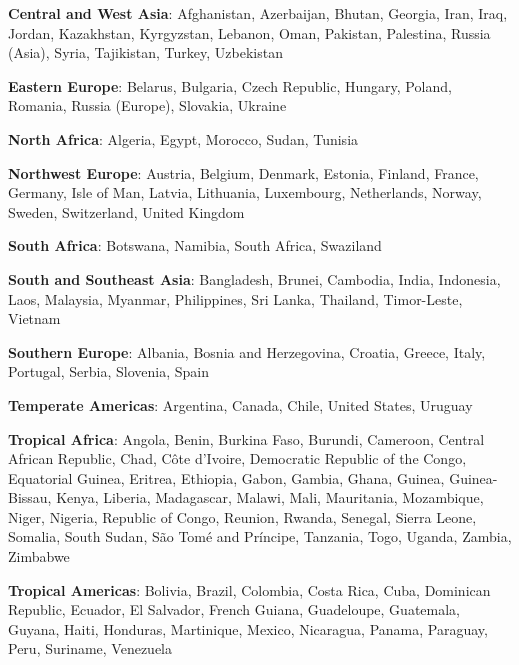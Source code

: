 \item \textbf{Central and West Asia}: Afghanistan, Azerbaijan, Bhutan, Georgia, Iran, Iraq, Jordan, Kazakhstan, Kyrgyzstan, Lebanon, Oman, Pakistan, Palestina, Russia (Asia), Syria, Tajikistan, Turkey, Uzbekistan
\item \textbf{Eastern Europe}: Belarus, Bulgaria, Czech Republic, Hungary, Poland, Romania, Russia (Europe), Slovakia, Ukraine
\item \textbf{North Africa}: Algeria, Egypt, Morocco, Sudan, Tunisia
\item \textbf{Northwest Europe}: Austria, Belgium, Denmark, Estonia, Finland, France, Germany, Isle of Man, Latvia, Lithuania, Luxembourg, Netherlands, Norway, Sweden, Switzerland, United Kingdom
\item \textbf{South Africa}: Botswana, Namibia, South Africa, Swaziland
\item \textbf{South and Southeast Asia}: Bangladesh, Brunei, Cambodia, India, Indonesia, Laos, Malaysia, Myanmar, Philippines, Sri Lanka, Thailand, Timor-Leste, Vietnam
\item \textbf{Southern Europe}: Albania, Bosnia and Herzegovina, Croatia, Greece, Italy, Portugal, Serbia, Slovenia, Spain
\item \textbf{Temperate Americas}: Argentina, Canada, Chile, United States, Uruguay
\item \textbf{Tropical Africa}: Angola, Benin, Burkina Faso, Burundi, Cameroon, Central African Republic, Chad, Côte d'Ivoire, Democratic Republic of the Congo, Equatorial Guinea, Eritrea, Ethiopia, Gabon, Gambia, Ghana, Guinea, Guinea-Bissau, Kenya, Liberia, Madagascar, Malawi, Mali, Mauritania, Mozambique, Niger, Nigeria, Republic of Congo, Reunion, Rwanda, Senegal, Sierra Leone, Somalia, South Sudan, São Tomé and Príncipe, Tanzania, Togo, Uganda, Zambia, Zimbabwe
\item \textbf{Tropical Americas}: Bolivia, Brazil, Colombia, Costa Rica, Cuba, Dominican Republic, Ecuador, El Salvador, French Guiana, Guadeloupe, Guatemala, Guyana, Haiti, Honduras, Martinique, Mexico, Nicaragua, Panama, Paraguay, Peru, Suriname, Venezuela
